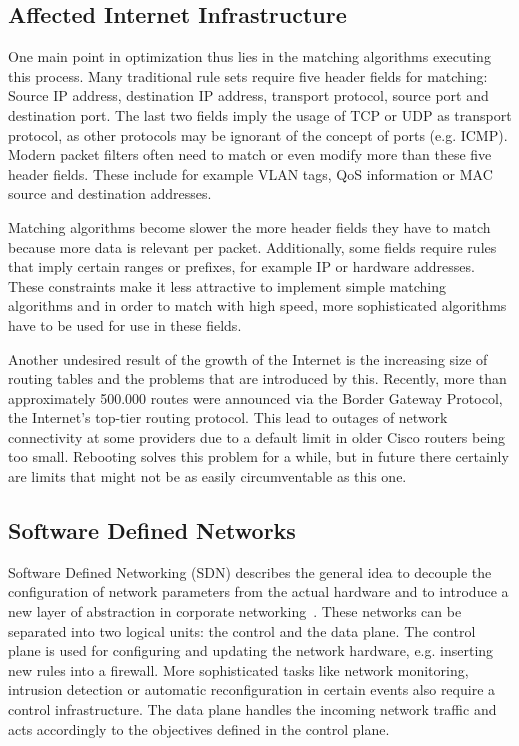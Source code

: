 \documentclass[a4paper,
		12pt,
		parskip=full,
		titlepage
		]{scrartcl}
\begin{document}
\subsection{Affected Internet Infrastructure}
One main point in optimization thus lies in the matching algorithms executing this process.
Many traditional rule sets require five header fields for matching: Source IP address, destination IP address, transport protocol, source port and destination port.
The last two fields imply the usage of TCP or UDP as transport protocol, as other protocols may be ignorant of the concept of ports (e.g. ICMP).
Modern packet filters often need to match or even modify more than these five header fields.
These include for example VLAN tags, QoS information or MAC source and destination addresses.

Matching algorithms become slower the more header fields they have to match because more data is relevant per packet.
Additionally, some fields require rules that imply certain ranges or prefixes, for example IP or hardware addresses.
These constraints make it less attractive to implement simple matching algorithms and in order to match with high speed, more sophisticated
algorithms have to be used for use in these fields.

Another undesired result of the growth of the Internet is the increasing size of routing tables and the problems that are introduced by this.
Recently, more than approximately 500.000 routes were announced via the Border Gateway Protocol, the Internet's top-tier routing protocol.
This lead to outages of network connectivity at some providers due to a default limit in older Cisco routers being too small\cite{outage}.
Rebooting solves this problem for a while, but in future there certainly are limits that might not be as easily circumventable as this one.

\subsection{Software Defined Networks}
\label{sec:SDN}
Software Defined Networking (SDN) describes the general idea to decouple 
the configuration of network parameters from the actual hardware and to 
introduce a new layer of abstraction in corporate networking~\cite{onf_whitepaper}.
These networks can be separated into two logical units: the control and the data plane.
The control plane is used for configuring and updating the network hardware, e.g. inserting new rules into a firewall.
More sophisticated tasks like network monitoring, intrusion detection or automatic reconfiguration in certain events also require a control infrastructure.
The data plane handles the incoming network traffic and acts accordingly to the objectives defined in the control plane.
\end{document}
